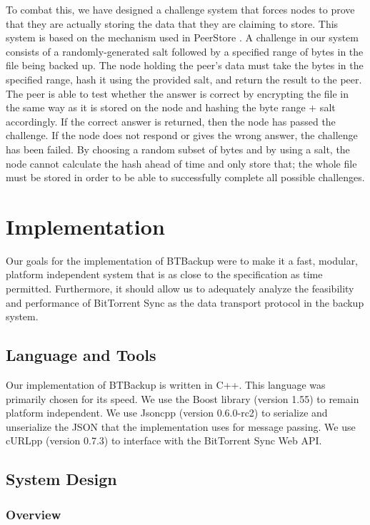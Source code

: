 \documentclass[12pt]{report}
\begin{document}
To combat this, we have designed a challenge system that forces nodes to prove that they are actually storing the data that they are claiming to store. This system is based on the mechanism used in PeerStore \cite{PeerStore}. A challenge in our system consists of a randomly-generated salt followed by a specified range of bytes in the file being backed up. The node holding the peer's data must take the bytes in the specified range, hash it using the provided salt, and return the result to the peer. The peer is able to test whether the answer is correct by encrypting the file in the same way as it is stored on the node and hashing the byte range + salt accordingly. If the correct answer is returned, then the node has passed the challenge. If the node does not respond or gives the wrong answer, the challenge has been failed. By choosing a random subset of bytes and by using a salt, the node cannot calculate the hash ahead of time and only store that; the whole file must be stored in order to be able to successfully complete all possible challenges.


\chapter{Implementation} \label{chap:impl}

Our goals for the implementation of BTBackup were to make it a fast, modular, platform independent system that is as close to the specification as time permitted. Furthermore, it should allow us to adequately analyze the feasibility and performance of BitTorrent Sync as the data transport protocol in the backup system.

\section{Language and Tools}

Our implementation of BTBackup is written in C++. This language was primarily chosen for its speed. We use the Boost library (version 1.55) to remain platform independent. We use Jsoncpp (version 0.6.0-rc2) to serialize and unserialize the JSON that the implementation uses for message passing. We use cURLpp (version 0.7.3) to interface with the BitTorrent Sync Web API.

\section{System Design}
\subsection{Overview} \label{subsec:Overview_sec:SystemDesign_chap:Implementation}
\end{document}

